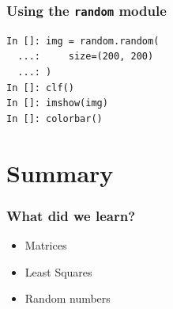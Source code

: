 \documentclass[14pt,compress]{beamer}
\newcounter{time}
\newcommand{\inctime}[1]{\addtocounter{time}{#1}{\tiny \thetime\ m}}
\newcommand{\typ}[1]{\lstinline{#1}}
\begin{document}
\begin{frame}[fragile]
    \frametitle{Using the \typ{random} module}
\begin{lstlisting}
In []: img = random.random(
  ...:     size=(200, 200)
  ...: )
In []: clf()
In []: imshow(img)
In []: colorbar()
\end{lstlisting}
\end{frame}



\section{Summary}
\begin{frame}
  \frametitle{What did we learn?}
  \begin{itemize}
  \item Matrices
  \item Least Squares
  \item Random numbers
  \end{itemize}
\inctime{10}
\end{frame}
\end{document}
